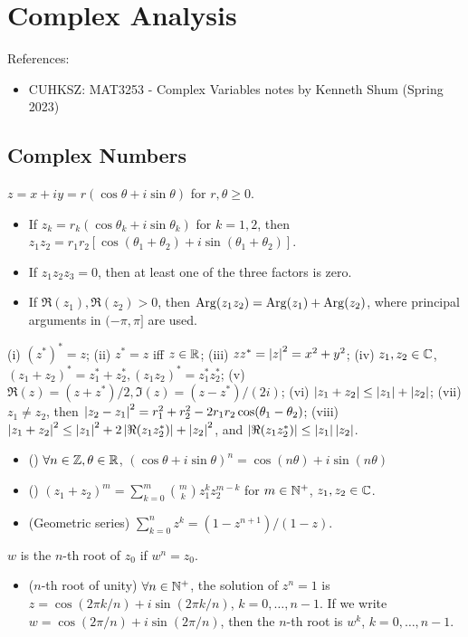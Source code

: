 \documentclass[10pt,a4paper]{book}
\begin{document}
	\MakeScribeTop
	\tableofcontents


\chapter{Complex Analysis}\label{chap:complex}
References: 
\begin{itemize}
	\item CUHKSZ: MAT3253 - Complex Variables notes by Kenneth Shum (Spring 2023)
\end{itemize}

\section{Complex Numbers}\label{sec:complex-num}
\underline{} $z=x+iy=r(\cos\theta+i\sin\theta)$ for $r,\theta \geq 0$.
\begin{itemize}
	\item If $z_k=r_k(\cos\theta_k+i\sin\theta_k)$ for $k=1,2$, then $z_1z_2=r_1r_2[\cos(\theta_1+\theta_2)+i\sin(\theta_1+\theta_2)]$.   
	\item If $z_1z_2z_3=0$, then at least one of the three factors is zero. 
	\item If $\Re(z_1),\Re(z_2)>0$, then $\mathrm{Arg}(z_1z_2)=\mathrm{Arg}(z_1)+\mathrm{Arg}(z_2)$, where principal arguments in $(-\pi,\pi]$ are used.    
\end{itemize}   
\underline{} (i) $(z^*)^*=z$; (ii) $z^*=z$ iff $z\in\mathbb R$; (iii) $zz^*=\left\lvert z\right\rvert^2=x^2+y^2$; (iv) $z_1,z_2\in\mathbb C$, $(z_1+z_2)^*=z_1^*+z_2^*, (z_1z_2)^*=z_1^*z_2^*$; (v) $\Re(z)=(z+z^*)/2, \Im(z)=(z-z^*)/(2i)$; (vi) $\left\lvert z_1+z_2\right\rvert\leq \left\lvert z_1\right\rvert+\left\lvert z_2\right\rvert$; (vii) $z_1\neq z_2$, then $\left\lvert z_2-z_1\right\rvert^2 = r_1^2 + r_2^2 - 2r_1r_2\cos(\theta_1-\theta_2)$; (viii) $\left\lvert z_1+z_2\right\rvert^2\leq \left\lvert z_1\right\rvert^2 + 2\left\lvert\Re(z_1z_2^*)\right\rvert + \left\lvert z_2\right\rvert^2$, and $\left\lvert\Re (z_1z_2^*)\right\rvert\leq\left\lvert z_1\right\rvert\left\lvert z_2\right\rvert$.
\begin{itemize}
	\item () $\forall n\in\mathbb Z, \theta\in\mathbb R$, $(\cos\theta+i\sin\theta)^n=\cos(n\theta)+i\sin(n\theta)$ 
	\item () $(z_1+z_2)^m=\sum_{k=0}^{m}\binom{m}{k}z_1^kz_2^{m-k}$ for $m\in\mathbb N^+$, $z_1,z_2\in\mathbb C$.   
	\item (Geometric series) $\sum_{k=0}^{n}z^k=(1-z^{n+1})/(1-z)$.
\end{itemize}
\underline{} $w$ is the $n$-th root of $z_0$ if $w^n=z_0$.    
\begin{itemize}
	\item ($n$-th root of unity) $\forall n\in\mathbb N^+$, the solution of $z^n=1$ is $z=\cos(2\pi k/n)+i\sin(2\pi k/n)$, $k=0,\ldots,n-1$.
	If we write $w=\cos(2\pi/n)+i\sin(2\pi/n)$, then the $n$-th root is $w^k$, $k=0,\ldots,n-1$.       
\end{itemize}
\end{document}

